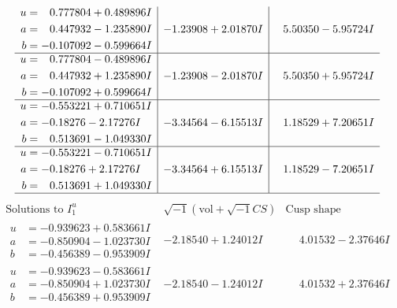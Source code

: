 \documentclass[1p]{elsarticle_modified}
\theoremstyle{definition}
\newcommand{\I}{\sqrt{-1}}
\begin{document}
$$\begin{array}{c|c|c}
\begin{aligned}
u &= \phantom{-}0.777804 + 0.489896 I \\
a &= \phantom{-}0.447932 - 1.235890 I \\
b &= -0.107092 - 0.599664 I\end{aligned}
 & -1.23908 + 2.01870 I & \phantom{-}5.50350 - 5.95724 I \\ \hline\begin{aligned}
u &= \phantom{-}0.777804 - 0.489896 I \\
a &= \phantom{-}0.447932 + 1.235890 I \\
b &= -0.107092 + 0.599664 I\end{aligned}
 & -1.23908 - 2.01870 I & \phantom{-}5.50350 + 5.95724 I \\ \hline\begin{aligned}
u &= -0.553221 + 0.710651 I \\
a &= -0.18276 - 2.17276 I \\
b &= \phantom{-}0.513691 - 1.049330 I\end{aligned}
 & -3.34564 - 6.15513 I & \phantom{-}1.18529 + 7.20651 I \\ \hline\begin{aligned}
u &= -0.553221 - 0.710651 I \\
a &= -0.18276 + 2.17276 I \\
b &= \phantom{-}0.513691 + 1.049330 I\end{aligned}
 & -3.34564 + 6.15513 I & \phantom{-}1.18529 - 7.20651 I\\
 \hline 
 \end{array}$$\newpage$$\begin{array}{c|c|c}  
\text{Solutions to }I^u_{1}& \I (\text{vol} + \sqrt{-1}CS) & \text{Cusp shape}\\
 \hline 
\begin{aligned}
u &= -0.939623 + 0.583661 I \\
a &= -0.850904 - 1.023730 I \\
b &= -0.456389 - 0.953909 I\end{aligned}
 & -2.18540 + 1.24012 I & \phantom{-}4.01532 - 2.37646 I \\ \hline\begin{aligned}
u &= -0.939623 - 0.583661 I \\
a &= -0.850904 + 1.023730 I \\
b &= -0.456389 + 0.953909 I\end{aligned}
 & -2.18540 - 1.24012 I & \phantom{-}4.01532 + 2.37646 I \\ \hline\begin{aligned}

\end{aligned}
\end{array}$$
\end{document}
